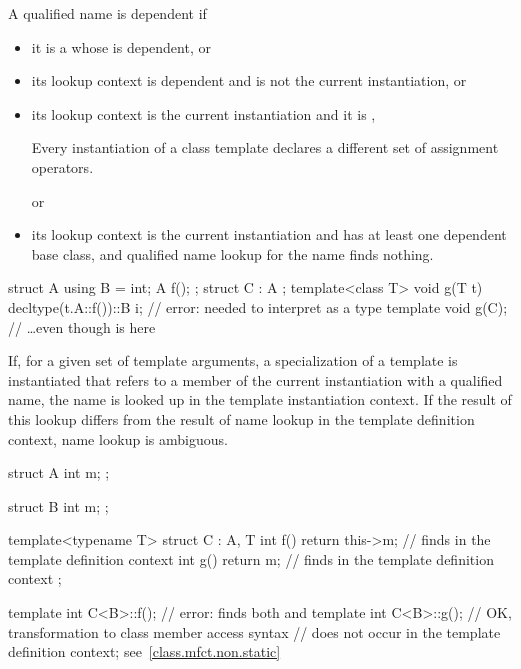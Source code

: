 \pnum
A qualified name is dependent if

\begin{itemize}
\item
it is a 
whose  is dependent, or
\item
its lookup context is dependent and is not the current instantiation, or
\item
its lookup context is the current instantiation and
it is ,
\begin{footnote}
Every instantiation of a class template declares
a different set of assignment operators.
\end{footnote}
or
\item
its lookup context is the current instantiation and
has at least one dependent base class, and
qualified name lookup for the name finds nothing.
\end{itemize}
\begin{example}
\begin{codeblock}
struct A {
  using B = int;
  A f();
};
struct C : A {};
template<class T>
void g(T t) {
  decltype(t.A::f())::B i;      // error:  needed to interpret  as a type
}
template void g(C);             // \ldots even though  is  here
\end{codeblock}
\end{example}

\pnum
If, for a given set of template arguments, a specialization of a template is
instantiated that refers to a member of the current instantiation with a
qualified name, the name is looked up in the
template instantiation context. If the result of this lookup differs from the
result of name lookup in the template definition context, name lookup is
ambiguous.
\begin{example}
\begin{codeblock}
struct A {
  int m;
};

struct B {
  int m;
};

template<typename T>
struct C : A, T {
  int f() { return this->m; }   // finds  in the template definition context
  int g() { return m; }         // finds  in the template definition context
};

template int C<B>::f();         // error: finds both  and 
template int C<B>::g();         // OK, transformation to class member access syntax
                                // does not occur in the template definition context; see~\ref{class.mfct.non.static}
\end{codeblock}
\end{example}

